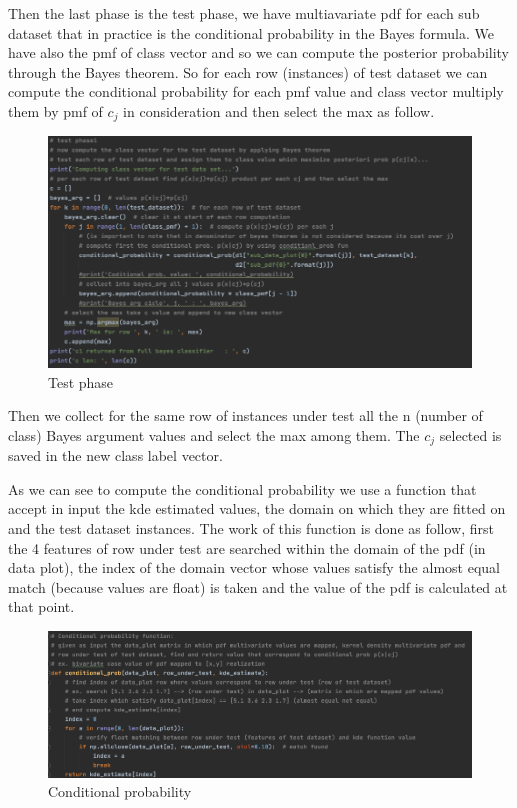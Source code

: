 \documentclass[12pt]{report}
\begin{document}
\newpage
Then the last phase is the test phase, we have multiavariate pdf for each sub dataset that in practice is the conditional probability in the Bayes formula. We have also the pmf of class vector and so we can compute the posterior probability through the Bayes theorem. So for each row (instances) of test dataset we can compute the conditional probability for each pmf value and class vector multiply them by pmf of $c_{j}$ in consideration and then select the max as follow.

\begin{figure}[h!]
    \centering
    \includegraphics[width=16cm]{Pictures/test phase.png}
    \caption{Test phase}
\end{figure}

Then we collect for the same row of instances under test all the n (number of class) Bayes argument values and select the max among them. The $c_{j}$ selected is saved in the new class label vector.

\newpage
As we can see to compute the conditional probability we use a function that accept in input the kde estimated values, the domain on which they are fitted on and the test dataset instances. The work of this function is done as follow, first the 4 features of row under test are searched within the domain of the pdf (in data plot), the index of the domain vector whose values satisfy the almost equal match (because values are float) is taken and the value of the pdf is calculated at that point.

\begin{figure}[h!]
    \centering
    \includegraphics[width=16cm]{Pictures/Conditional prob.png}
    \caption{Conditional probability}
\end{figure}
\end{document}
